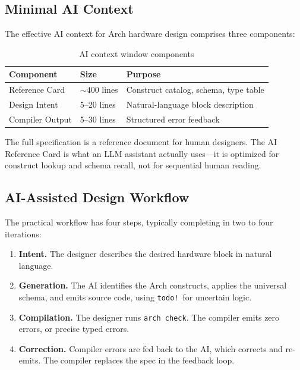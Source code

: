 \documentclass[11pt,twocolumn]{article}
\begin{document}
\subsection{Minimal AI Context}

The effective AI context for Arch hardware design comprises three components:

\begin{table}[t]
\centering
\caption{AI context window components}
\label{tab:aicontext}
\small
\begin{tabular}{@{}llp{3.2cm}@{}}
\toprule
\textbf{Component} & \textbf{Size} & \textbf{Purpose} \\
\midrule
Reference Card & ${\sim}400$ lines & Construct catalog, schema, type table \\
Design Intent & 5--20 lines & Natural-language block description \\
Compiler Output & 5--30 lines & Structured error feedback \\
\bottomrule
\end{tabular}
\end{table}

The full specification is a reference document for human designers.
The AI Reference Card is what an LLM assistant actually uses---it is optimized for construct lookup and schema recall, not for sequential human reading.

\subsection{AI-Assisted Design Workflow}

The practical workflow has four steps, typically completing in two to four iterations:

\begin{enumerate}
\item \textbf{Intent.} The designer describes the desired hardware block in natural language.
\item \textbf{Generation.} The AI identifies the Arch constructs, applies the universal schema, and emits source code, using \texttt{todo!}\ for uncertain logic.
\item \textbf{Compilation.} The designer runs \texttt{arch check}. The compiler emits zero errors, or precise typed errors.
\item \textbf{Correction.} Compiler errors are fed back to the AI, which corrects and re-emits. The compiler replaces the spec in the feedback loop.
\end{enumerate}
\end{document}
